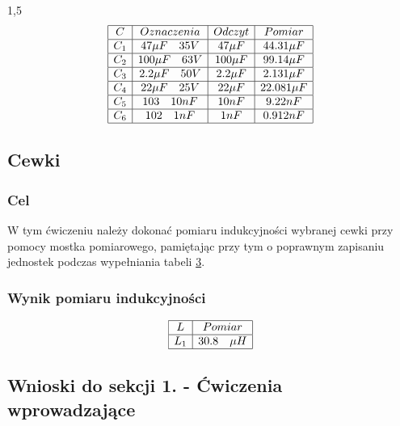 \documentclass[polish,polish,a4paper]{article}
\begin{document}
\begin{spacing}{1,5}
		\begin{equation*}
		\label{eq:tab2}
		\begin{array}{|c|c|c|c|}
		\hline
		C&Oznaczenia&Odczyt&Pomiar \\ 
		\hline
		C_{1}& 47 \mu F \quad 35V &47 \mu F&44.31\mu F \\ 
		\hline
		C_{2}&100 \mu F \quad 63V &100 \mu F&99.14 \mu F \\ 
		\hline
		C_{3}&2.2 \mu F \quad 50V &2.2 \mu F&2.131 \mu F\\ 
		\hline
		C_{4}&22 \mu F \quad 25V&22 \mu F&22.081 \mu F  \\ 
		\hline
		C_{5}&103 \quad 10nF&10nF&9.22nF \\ 
		\hline
		C_{6}&102 \quad 1nF&1nF&0.912nF \\ 
		\hline
		\end{array}
		\end{equation*}
		
		
		\subsection{Cewki}
		\subsubsection*{Cel}
		W tym ćwiczeniu należy dokonać pomiaru indukcyjności wybranej cewki przy pomocy mostka pomiarowego,
		pamiętając przy tym o poprawnym zapisaniu jednostek podczas wypełniania tabeli \hyperref[eq:tab3]{3}.
		
		\subsubsection*{Wynik pomiaru indukcyjności}
		\begin{equation*}
		\label{eq:tab3}
		\begin{array}{|c|c|}
		\hline
		L&Pomiar \\
		\hline
		L_{1}&30.8 \quad \mu H \\
		\hline
		\end{array}
		\end{equation*}
		
		\subsection*{Wnioski do sekcji 1. - Ćwiczenia wprowadzające}
		

\end{spacing}
\end{document}
